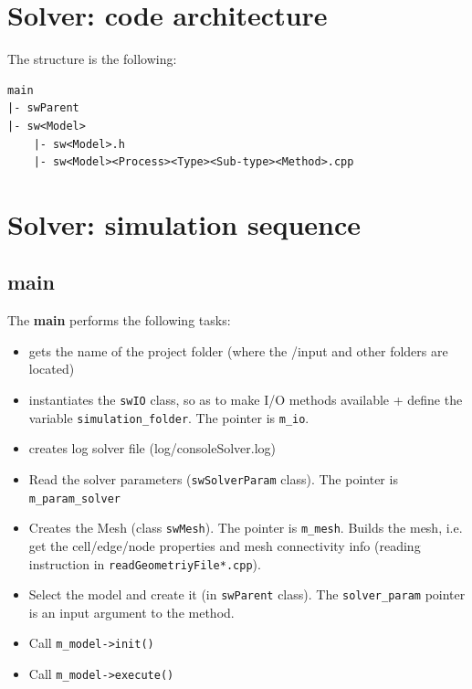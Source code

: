 \section{Solver: code architecture}
The structure is the following:
\begin{verbatim}
main
|- swParent
|- sw<Model>
    |- sw<Model>.h
    |- sw<Model><Process><Type><Sub-type><Method>.cpp
\end{verbatim}
\section{Solver: simulation sequence}
\subsection{main}
The \textbf{main} performs the following tasks:
\begin{itemize}
\item gets the name of the \swd project folder (where the /input and other folders are located)
\item instantiates the \texttt{swIO} class, so as to make I/O methods available + define the variable \texttt{simulation\_folder}. The pointer is \texttt{m\_io}.
\item creates log solver file (log/consoleSolver.log)
\item Read the solver parameters (\texttt{swSolverParam} class). The pointer is \texttt{m\_param\_solver}
\item Creates the Mesh (class \texttt{swMesh}). The pointer is \texttt{m\_mesh}. Builds the mesh, i.e. get the cell/edge/node properties and mesh connectivity info (reading instruction in \texttt{readGeometriyFile*.cpp}).
\item Select the model and create it (in \texttt{swParent} class). The \texttt{solver\_param} pointer is an input argument to the method. 
\item Call \texttt{m\_model->init()}
\item Call \texttt{m\_model->execute()}


\end{itemize}
